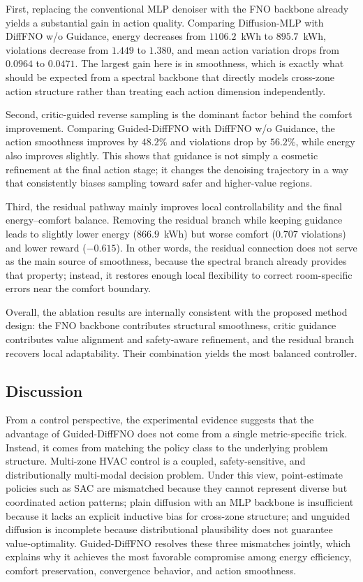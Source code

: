 First, replacing the conventional MLP denoiser with the FNO backbone already yields a substantial gain in action quality. Comparing Diffusion-MLP with DiffFNO w/o Guidance, energy decreases from $1106.2$~kWh to $895.7$~kWh, violations decrease from $1.449$ to $1.380$, and mean action variation drops from $0.0964$ to $0.0471$. The largest gain here is in smoothness, which is exactly what should be expected from a spectral backbone that directly models cross-zone action structure rather than treating each action dimension independently.

Second, critic-guided reverse sampling is the dominant factor behind the comfort improvement. Comparing Guided-DiffFNO with DiffFNO w/o Guidance, the action smoothness improves by $48.2\%$ and violations drop by $56.2\%$, while energy also improves slightly. This shows that guidance is not simply a cosmetic refinement at the final action stage; it changes the denoising trajectory in a way that consistently biases sampling toward safer and higher-value regions.

Third, the residual pathway mainly improves local controllability and the final energy--comfort balance. Removing the residual branch while keeping guidance leads to slightly lower energy ($866.9$~kWh) but worse comfort ($0.707$ violations) and lower reward ($-0.615$). In other words, the residual connection does not serve as the main source of smoothness, because the spectral branch already provides that property; instead, it restores enough local flexibility to correct room-specific errors near the comfort boundary.

Overall, the ablation results are internally consistent with the proposed method design: the FNO backbone contributes structural smoothness, critic guidance contributes value alignment and safety-aware refinement, and the residual branch recovers local adaptability. Their combination yields the most balanced controller.

\subsection{Discussion}

From a control perspective, the experimental evidence suggests that the advantage of Guided-DiffFNO does not come from a single metric-specific trick. Instead, it comes from matching the policy class to the underlying problem structure. Multi-zone HVAC control is a coupled, safety-sensitive, and distributionally multi-modal decision problem. Under this view, point-estimate policies such as SAC are mismatched because they cannot represent diverse but coordinated action patterns; plain diffusion with an MLP backbone is insufficient because it lacks an explicit inductive bias for cross-zone structure; and unguided diffusion is incomplete because distributional plausibility does not guarantee value-optimality. Guided-DiffFNO resolves these three mismatches jointly, which explains why it achieves the most favorable compromise among energy efficiency, comfort preservation, convergence behavior, and action smoothness.
